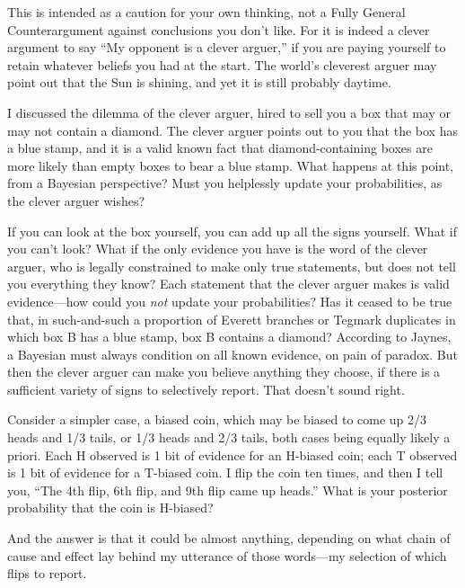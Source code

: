{
 This is intended as a caution for your own thinking, not a Fully
General Counterargument against conclusions you don't
like. For it is indeed a clever argument to say ``My
opponent is a clever arguer,'' if you are paying
yourself to retain whatever beliefs you had at the start. The
world's cleverest arguer may point out that the Sun is
shining, and yet it is still probably daytime.}

\myendsectiontext


{
 I discussed the dilemma of the clever arguer, hired to sell you a
box that may or may not contain a diamond. The clever arguer points out
to you that the box has a blue stamp, and it is a valid known fact that
diamond-containing boxes are more likely than empty boxes to bear a
blue stamp. What happens at this point, from a Bayesian perspective?
Must you helplessly update your probabilities, as the clever arguer
wishes? }

{
 If you can look at the box yourself, you can add up all the signs
yourself. What if you can't look? What if the only
evidence you have is the word of the clever arguer, who is legally
constrained to make only true statements, but does not tell you
everything they know? Each statement that the clever arguer makes is
valid evidence---how could you \textit{not} update your probabilities?
Has it ceased to be true that, in such-and-such a proportion of Everett
branches or Tegmark duplicates in which box B has a blue stamp, box B
contains a diamond? According to Jaynes, a Bayesian must always
condition on all known evidence, on pain of paradox. But then the
clever arguer can make you believe anything they choose, if there is a
sufficient variety of signs to selectively report. That
doesn't sound right.}

{
 Consider a simpler case, a biased coin, which may be biased to
come up 2/3 heads and 1/3 tails, or 1/3 heads and 2/3 tails, both cases
being equally likely a priori. Each H observed is 1 bit of evidence for
an H-biased coin; each T observed is 1 bit of evidence for a T-biased
coin. I flip the coin ten times, and then I tell you,
``The 4th flip, 6th flip, and 9th flip came up
heads.'' What is your posterior probability that the
coin is H-biased?}

{
 And the answer is that it could be almost anything, depending on
what chain of cause and effect lay behind my utterance of those
words---my selection of which flips to report.}

